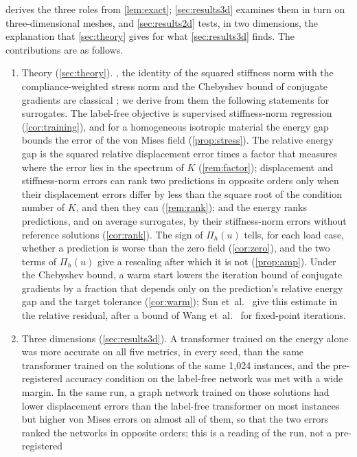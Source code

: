  derives the three roles from \cref{lem:exact}; \cref{sec:results3d}
examines them in turn on three-dimensional meshes, and \cref{sec:results2d} tests, in two
dimensions, the explanation that \cref{sec:theory} gives for what \cref{sec:results3d}
finds. The contributions are as follows.
\begin{enumerate}
\item Theory (\cref{sec:theory}). , the identity of the squared stiffness
norm with the compliance-weighted stress norm and the Chebyshev bound of conjugate
gradients are classical \cite{Ciarlet1978,Saad2003}; we derive from them the following
statements for surrogates. The label-free objective is supervised stiffness-norm regression
(\cref{cor:training}), and for a homogeneous isotropic material the energy gap bounds the
error of the von Mises field (\cref{prop:stress}). The relative energy gap is the squared
relative displacement error times a factor that measures where the error lies in the
spectrum of $K$ (\cref{rem:factor}); displacement and stiffness-norm errors can rank two
predictions in opposite orders only when their displacement errors differ by less than the
square root of the condition number of $K$, and then they can (\cref{rem:rank}); and the
energy ranks predictions, and on average surrogates, by their stiffness-norm errors
without reference solutions (\cref{cor:rank}). The sign of $\Pi_h(u)$ tells, for each load
case, whether a prediction is worse than the zero field (\cref{cor:zero}), and the two terms
of $\Pi_h(u)$ give a rescaling after which it is not (\cref{prop:amp}). Under the Chebyshev
bound, a warm start lowers the iteration bound of conjugate gradients by a fraction that
depends only on the prediction's relative energy gap and the target tolerance
(\cref{cor:warm}); Sun et~al.~\cite{Sun2026FEVessel} give this estimate in the relative
residual, after a bound of Wang et~al.~\cite{Wang2026PretrainFEM} for fixed-point
iterations.
\item Three dimensions (\cref{sec:results3d}). A transformer trained on the energy alone
was more accurate on all five metrics, in every seed, than the same transformer trained on
the solutions of the same 1,024 instances, and the pre-registered accuracy condition on the
label-free network was met with a wide margin. In the same run, a graph network trained on
those solutions had lower displacement errors than the label-free transformer on most
instances but higher von Mises errors on almost all of them, so that the two errors ranked
the networks in opposite orders; this is a reading of the run, not a pre-registered

\end{enumerate}
